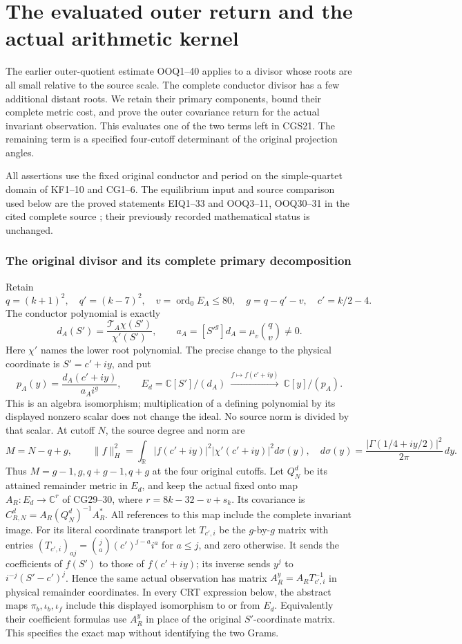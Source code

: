 \documentclass[11pt]{article}
\newcommand{\C}{\mathbb C}\newcommand{\Pp}{\mathcal P}
\begin{document}
\clearpage\part{The evaluated outer return and the actual arithmetic kernel}


The earlier outer-quotient estimate OOQ1--40 applies to a divisor
whose roots are all small relative to the source scale. The complete
conductor divisor has a few additional distant roots. We retain their
primary components, bound their complete metric cost, and prove the
outer covariance return for the actual invariant observation. This
evaluates one of the two terms left in CGS21. The remaining term is
a specified four-cutoff determinant of the original projection angles.

All assertions use the fixed original conductor and period on the
simple-quartet domain of KF1--10 and CG1--6. The equilibrium input and
source comparison used below are the proved statements EIQ1--33 and
OOQ3--11, OOQ30--31 in the cited complete source \cite{OOQ}; their
previously recorded mathematical status is unchanged.

\section{The original divisor and its complete primary decomposition}

Retain
\[
q=(k+1)^2,\quad q'=(k-7)^2,\quad v=\operatorname{ord}_0E_A\le80,
\quad g=q-q'-v,\quad c'=k/2-4.
\]
The conductor polynomial is exactly
\[
d_A(S')=\frac{\mathcal T_A\chi(S')}{\chi'(S')},\qquad
a_A=[S'^g]d_A=\mu_v\binom qv\ne0.
\]
Here \(\chi'\) names the lower root polynomial. The precise change
to the physical coordinate is \(S'=c'+iy\), and put
\[
p_A(y)=\frac{d_A(c'+iy)}{a_A i^g},\qquad
E_d=\C[S']/(d_A)\ \xrightarrow{f\mapsto f(c'+iy)}\
\C[y]/(p_A).
\tag{DCR1}
\]
This is an algebra isomorphism; multiplication of a defining
polynomial by its displayed nonzero scalar does not change the ideal.
No source norm is divided by that scalar. At cutoff \(N\), the source
degree and norm are
\[
M=N-q+g,\qquad
\|f\|_H^2=\int_{\mathbb R}
 |f(c'+iy)|^2|\chi'(c'+iy)|^2d\sigma(y),\quad
d\sigma(y)=\frac{|\Gamma(1/4+iy/2)|^2}{2\pi}\,dy.
\tag{DCR2}
\]
Thus \(M=g-1,g,q+g-1,q+g\) at the four original cutoffs.
Let \(Q_N^d\) be its attained remainder metric in \(E_d\), and keep
the actual fixed onto map \(A_R:E_d\to\C^r\) of CG29--30, where
\(r=8k-32-v+s_k\). Its covariance is
\(C_{R,N}^d=A_R(Q_N^d)^{-1}A_R^*\).
All references to this map include the complete invariant image.
For its literal coordinate transport let \(T_{c',i}\) be the
\(g\)-by-\(g\) matrix with entries
\((T_{c',i})_{aj}=\binom ja(c')^{j-a}i^a\) for \(a\le j\),
and zero otherwise. It sends the coefficients of \(f(S')\)
to those of \(f(c'+iy)\); its inverse sends \(y^j\) to
\(i^{-j}(S'-c')^j\). Hence the same actual observation has
matrix \(A_R^y=A_R T_{c',i}^{-1}\) in physical remainder
coordinates. In every CRT expression below, the abstract maps
\(\pi_b,\iota_b,\iota_f\) include this displayed isomorphism
to or from \(E_d\). Equivalently their coefficient formulas use
\(A_R^y\) in place of the original \(S'\)-coordinate matrix.
This specifies the exact map without identifying the two Grams.
\end{document}

